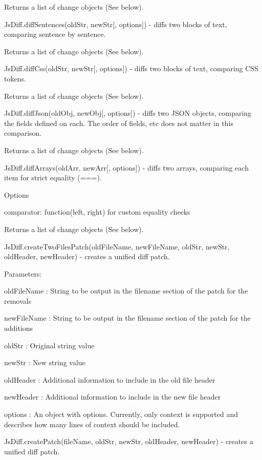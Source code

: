 \begin{DoxyItemize}
Returns a list of change objects (See below).
\item {\ttfamily Js\+Diff.\+diff\+Sentences(old\+Str, new\+Str\mbox{[}, options\mbox{]})} -\/ diffs two blocks of text, comparing sentence by sentence.

Returns a list of change objects (See below).
\item {\ttfamily Js\+Diff.\+diff\+Css(old\+Str, new\+Str\mbox{[}, options\mbox{]})} -\/ diffs two blocks of text, comparing C\+SS tokens.

Returns a list of change objects (See below).
\item {\ttfamily Js\+Diff.\+diff\+Json(old\+Obj, new\+Obj\mbox{[}, options\mbox{]})} -\/ diffs two J\+S\+ON objects, comparing the fields defined on each. The order of fields, etc does not matter in this comparison.

Returns a list of change objects (See below).
\item {\ttfamily Js\+Diff.\+diff\+Arrays(old\+Arr, new\+Arr\mbox{[}, options\mbox{]})} -\/ diffs two arrays, comparing each item for strict equality (===).

Options
\begin{DoxyItemize}
\item {\ttfamily comparator}\+: {\ttfamily function(left, right)} for custom equality checks
\end{DoxyItemize}

Returns a list of change objects (See below).
\item {\ttfamily Js\+Diff.\+create\+Two\+Files\+Patch(old\+File\+Name, new\+File\+Name, old\+Str, new\+Str, old\+Header, new\+Header)} -\/ creates a unified diff patch.

Parameters\+:
\begin{DoxyItemize}
\item {\ttfamily old\+File\+Name} \+: String to be output in the filename section of the patch for the removals
\item {\ttfamily new\+File\+Name} \+: String to be output in the filename section of the patch for the additions
\item {\ttfamily old\+Str} \+: Original string value
\item {\ttfamily new\+Str} \+: New string value
\item {\ttfamily old\+Header} \+: Additional information to include in the old file header
\item {\ttfamily new\+Header} \+: Additional information to include in the new file header
\item {\ttfamily options} \+: An object with options. Currently, only {\ttfamily context} is supported and describes how many lines of context should be included.
\end{DoxyItemize}
\item {\ttfamily Js\+Diff.\+create\+Patch(file\+Name, old\+Str, new\+Str, old\+Header, new\+Header)} -\/ creates a unified diff patch.


\end{DoxyItemize}

